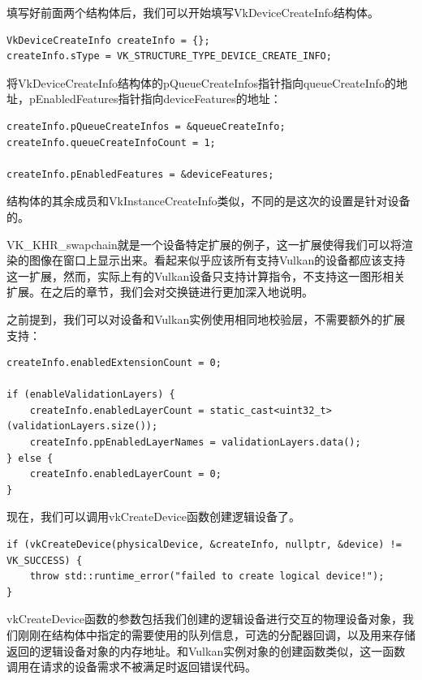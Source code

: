 \documentclass{ctexart}
\begin{document}
填写好前面两个结构体后，我们可以开始填写VkDeviceCreateInfo结构体。

\begin{lstlisting}[language={[ANSI]C}]
VkDeviceCreateInfo createInfo = {};
createInfo.sType = VK_STRUCTURE_TYPE_DEVICE_CREATE_INFO;
\end{lstlisting}

将VkDeviceCreateInfo结构体的pQueueCreateInfos指针指向queueCreateInfo的地址，pEnabledFeatures指针指向deviceFeatures的地址：

\begin{lstlisting}[language={[ANSI]C}]
createInfo.pQueueCreateInfos = &queueCreateInfo;
createInfo.queueCreateInfoCount = 1;

createInfo.pEnabledFeatures = &deviceFeatures;
\end{lstlisting}

结构体的其余成员和VkInstanceCreateInfo类似，不同的是这次的设置是针对设备的。

VK\_KHR\_swapchain就是一个设备特定扩展的例子，这一扩展使得我们可以将渲染的图像在窗口上显示出来。看起来似乎应该所有支持Vulkan的设备都应该支持这一扩展，然而，实际上有的Vulkan设备只支持计算指令，不支持这一图形相关扩展。在之后的章节，我们会对交换链进行更加深入地说明。

之前提到，我们可以对设备和Vulkan实例使用相同地校验层，不需要额外的扩展支持：

\begin{lstlisting}[language={[ANSI]C}]
createInfo.enabledExtensionCount = 0;

if (enableValidationLayers) {
	createInfo.enabledLayerCount = static_cast<uint32_t>(validationLayers.size());
	createInfo.ppEnabledLayerNames = validationLayers.data();
} else {
	createInfo.enabledLayerCount = 0;
}
\end{lstlisting}

现在，我们可以调用vkCreateDevice函数创建逻辑设备了。

\begin{lstlisting}[language={[ANSI]C}]
if (vkCreateDevice(physicalDevice, &createInfo, nullptr, &device) != VK_SUCCESS) {
	throw std::runtime_error("failed to create logical device!");
}
\end{lstlisting}

vkCreateDevice函数的参数包括我们创建的逻辑设备进行交互的物理设备对象，我们刚刚在结构体中指定的需要使用的队列信息，可选的分配器回调，以及用来存储返回的逻辑设备对象的内存地址。和Vulkan实例对象的创建函数类似，这一函数调用在请求的设备需求不被满足时返回错误代码。
\end{document}

